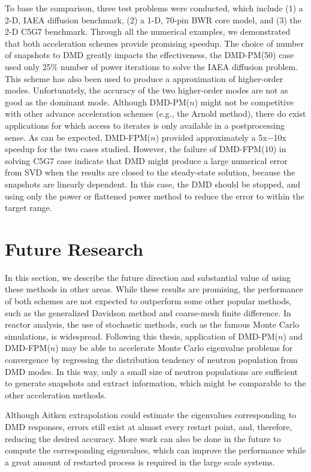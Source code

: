 To base the comparison, three test problems were conducted, which include (1) a 2-D, IAEA diffusion benchmark, (2) a 1-D, 70-pin BWR core model, and (3) the 2-D C5G7 benchmark.
Through all the numerical examples, we demonstrated that both acceleration schemes provide promising speedup. 
The choice of number of snapshots to DMD greatly impacts the effectiveness, the DMD-PM(50) case used only 25\% number of power iterations to solve the IAEA diffusion problem.
This scheme has also been used to produce a approximation of higher-order modes.
Unfortunately, the accuracy of the two higher-order modes are not as good as the dominant mode.
Although DMD-PM($n$) might not be competitive with other advance acceleration schemes (e.g., the Arnold method), there do exist applications for which access to iterates is only available in a postprocessing sense.
As can be expected, DMD-FPM($n$) provided approximately a 5x$-$10x speedup for the two cases studied.
However, the failure of DMD-FPM($10$) in solving C5G7 case indicate that DMD might produce a large numerical error from SVD when the results are closed to the steady-state solution, because the snapshots are linearly dependent.
In this case, the DMD should be stopped, and using only the power or flattened power method to reduce the error to within the target range.

\section{Future Research}
In this section, we describe the future direction and substantial value of using these methods in other areas.
While these results are promising, the performance of both schemes are not expected to outperform some other popular methods, such as the generalized Davidson method\cite{hamilton2011numerical} and coarse-mesh finite difference\cite{smith_1983}.
In reactor analysis, the use of stochastic methods, such as the famous Monte Carlo simulations, is widespread.
Following this thesis, application of DMD-PM($n$) and DMD-FPM($n$) may be able to accelerate Monte Carlo eigenvalue problems for convergence by regressing the distribution tendency of neutron population from DMD modes.
In this way, only a small size of neutron populations are sufficient to generate snapshots and extract information, which might be comparable to the other acceleration methods.

Although Aitken extrapolation could estimate the eigenvalues corresponding to DMD responses, errors still exist at almost every restart point, and, therefore, reducing the desired accuracy. 
More work can also be done in the future to compute the corresponding eigenvalues, which can improve the performance while a great amount of restarted process is required in the large scale systems.
